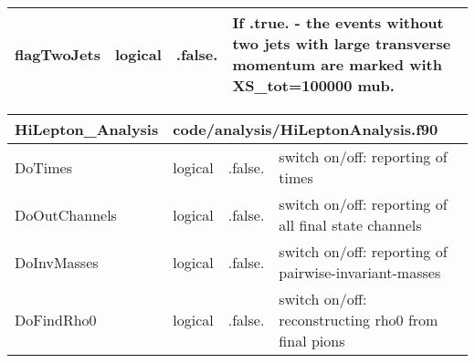 \documentclass{article}
\begin{document}
\begin{longtable}{llll}
\midrule
flagTwoJets & \begin{minipage}[t]{2cm}logical\end{minipage} & \begin{minipage}[t]{2cm}.false.\end{minipage} & \begin{minipage}[t]{12cm}If .true. - the events without two jets with large transverse momentum are marked with XS\_tot=100000 mub.\end{minipage}\\*
\bottomrule
\end{longtable}
{ }




\begin{longtable}{llll}
\toprule
\textbf{\large{HiLepton\_Analysis}} & \multicolumn{3}{l}{\footnotesize{code/analysis/HiLeptonAnalysis.f90}}\\*
\midrule
\endfirsthead
\midrule
\endhead
DoTimes & \begin{minipage}[t]{2cm}logical\end{minipage} & \begin{minipage}[t]{2cm}.false.\end{minipage} & \begin{minipage}[t]{12cm}switch on/off: reporting of times\end{minipage}\\*
\midrule
DoOutChannels & \begin{minipage}[t]{2cm}logical\end{minipage} & \begin{minipage}[t]{2cm}.false.\end{minipage} & \begin{minipage}[t]{12cm}switch on/off: reporting of all final state channels\end{minipage}\\*
\midrule
DoInvMasses & \begin{minipage}[t]{2cm}logical\end{minipage} & \begin{minipage}[t]{2cm}.false.\end{minipage} & \begin{minipage}[t]{12cm}switch on/off: reporting of pairwise-invariant-masses\end{minipage}\\*
\midrule
DoFindRho0 & \begin{minipage}[t]{2cm}logical\end{minipage} & \begin{minipage}[t]{2cm}.false.\end{minipage} & \begin{minipage}[t]{12cm}switch on/off: reconstructing rho0 from final pions\end{minipage}\\*

\end{longtable}
\end{document}
